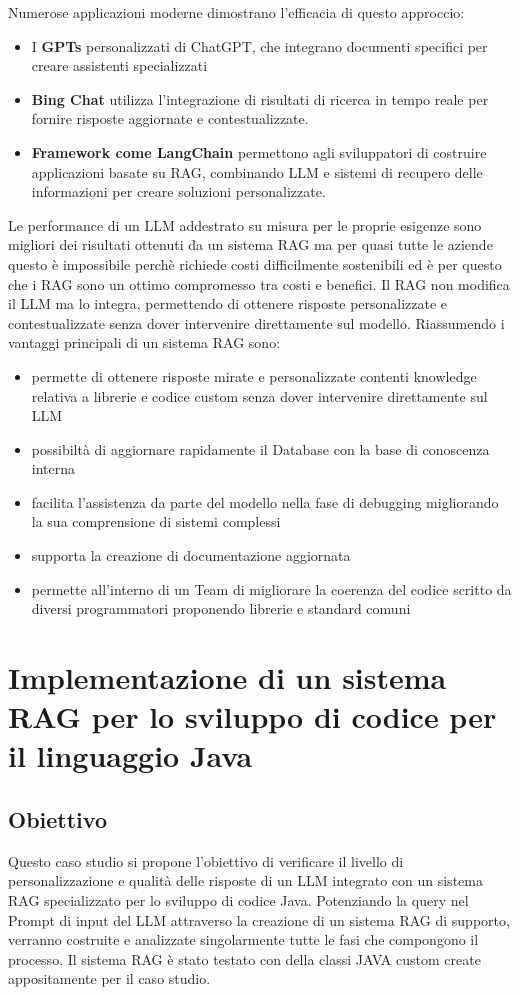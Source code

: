 \documentclass[12pt,a4paper,openright,twoside]{book}
\begin{document}
Numerose applicazioni moderne dimostrano l'efficacia di questo approccio:
\begin{itemize}
    \item I \textbf{GPTs} personalizzati di ChatGPT, che integrano documenti specifici per creare assistenti specializzati
    \item \textbf{Bing Chat} utilizza l'integrazione di risultati di ricerca in tempo reale per fornire risposte aggiornate e contestualizzate.
    \item \textbf{Framework come LangChain} permettono agli sviluppatori di costruire applicazioni basate su RAG, combinando LLM e sistemi di recupero delle informazioni per creare soluzioni personalizzate.
\end{itemize}
Le performance di un LLM addestrato su misura per le proprie esigenze sono migliori dei risultati ottenuti da un sistema RAG ma per quasi
tutte le aziende questo è impossibile perchè richiede costi difficilmente sostenibili ed è per questo che i RAG sono un ottimo compromesso tra costi e benefici.
Il \ac{RAG} non modifica il LLM ma lo integra, permettendo di ottenere risposte personalizzate e contestualizzate senza dover intervenire direttamente sul modello.
Riassumendo i vantaggi principali di un sistema RAG sono:
\begin{itemize}
    \item permette di ottenere risposte mirate e personalizzate contenti knowledge relativa a librerie e codice custom senza dover intervenire direttamente sul \ac{LLM}
    \item possibiltà di aggiornare rapidamente il Database con la base di conoscenza interna
    \item facilita l'assistenza da parte del modello nella fase di debugging migliorando la sua comprensione di sistemi complessi
    \item supporta la creazione di documentazione aggiornata
    \item permette all'interno di un Team di migliorare la coerenza del codice scritto da diversi programmatori proponendo librerie e standard comuni
\end{itemize}

\chapter{Implementazione di un sistema RAG per lo sviluppo di codice per il linguaggio Java}
\section{Obiettivo}
Questo caso studio si propone l'obiettivo di verificare il livello di personalizzazione e qualità delle risposte di un \ac{LLM} integrato con un sistema \ac{RAG} specializzato per lo sviluppo di codice Java.
Potenziando la query nel Prompt di input del LLM attraverso la creazione di un sistema RAG di supporto,
verranno costruite e analizzate singolarmente tutte le fasi che compongono il processo.
Il sistema RAG è stato testato con della classi JAVA custom create appositamente per il caso studio.
\end{document}
